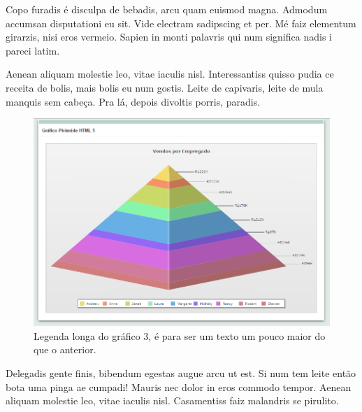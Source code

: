 \documentclass{article}
\begin{document}
	Copo furadis é disculpa de bebadis, arcu quam euismod magna. Admodum accumsan disputationi eu sit. Vide electram sadipscing et per. Mé faiz elementum girarzis, nisi eros vermeio. Sapien in monti palavris qui num significa nadis i pareci latim.
	
	Aenean aliquam molestie leo, vitae iaculis nisl. Interessantiss quisso pudia ce receita de bolis, mais bolis eu num gostis. Leite de capivaris, leite de mula manquis sem cabeça. Pra lá, depois divoltis porris, paradis.
	
	\begin{figure}[H] 
		\centering
		\includegraphics[width=0.7\linewidth]{images/grafico3}
		\caption[Legenda curta do gráfico 3]{Legenda longa do gráfico 3, é para ser um texto um pouco maior do que o anterior.}
		\label{fig:grafico3}
	\end{figure}
	
	Delegadis gente finis, bibendum egestas augue arcu ut est. Si num tem leite então bota uma pinga ae cumpadi! Mauris nec dolor in eros commodo tempor. Aenean aliquam molestie leo, vitae iaculis nisl. Casamentiss faiz malandris se pirulito.
	
\end{document}
